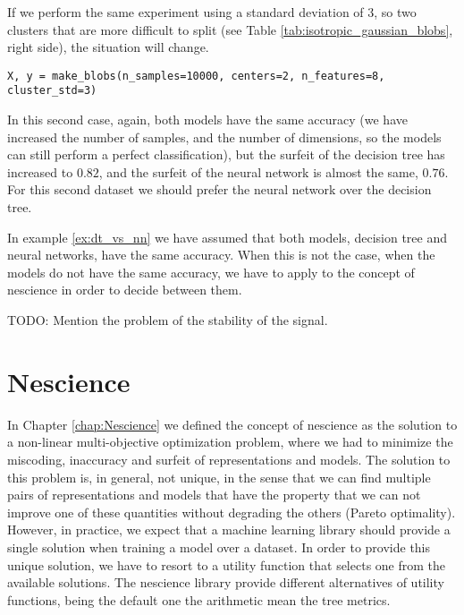 \begin{example}
If we perform the same experiment using a standard deviation of $3$, so two clusters that are more difficult to split (see Table \ref{tab:isotropic_gaussian_blobs}, right side), the situation will change.

\begin{sourcecode}
{\scriptsize \begin{verbatim}
X, y = make_blobs(n_samples=10000, centers=2, n_features=8, cluster_std=3)
\end{verbatim}}
\end{sourcecode}

In this second case, again, both models have the same accuracy (we have increased the number of samples, and the number of dimensions, so the models can still perform a perfect classification), but the surfeit of the decision tree has increased to $0.82$, and the surfeit of the neural network is almost the same, $0.76$. For this second dataset we should prefer the neural network over the decision tree.

\end{example}

In example \ref{ex:dt_vs_nn} we have assumed that both models, decision tree and neural networks, have the same accuracy. When this is not the case, when the models do not have the same accuracy, we have to apply to the concept of nescience in order to decide between them. 

\begin{remark}
{\color{red} TODO: Mention the problem of the stability of the signal.}
\end{remark}

%
%

\section{Nescience}
\label{sec:machine_learning_nescience}

In Chapter \ref{chap:Nescience} we defined the concept of nescience as the solution to a non-linear multi-objective optimization problem, where we had to minimize the miscoding, inaccuracy and surfeit of representations and models. The solution to this problem is, in general, not unique, in the sense that we can find multiple pairs of representations and models that have the property that we can not improve one of these quantities without degrading the others (Pareto optimality). However, in practice, we expect that a machine learning library should provide a single solution when training a model over a dataset. In order to provide this unique solution, we have to resort to a utility function that selects one from the available solutions. The nescience library provide different alternatives of utility functions, being the default one the arithmetic mean the tree metrics.

